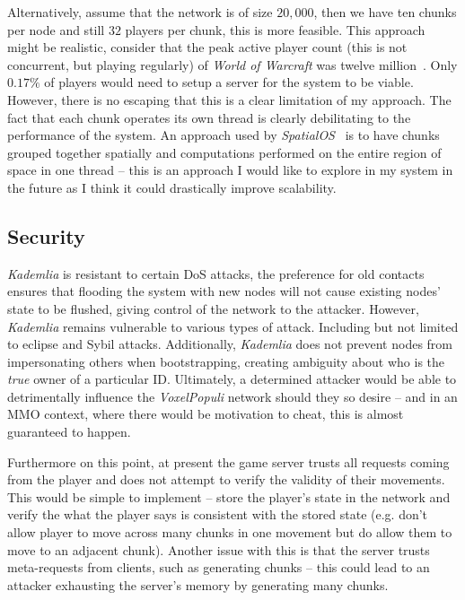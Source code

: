 \documentclass[12pt,notitlepage,a4paper]{report}
\newcommand{\kademlia}{\emph{Kademlia}}
\newcommand{\voxpop}{\emph{VoxelPopuli}}
\begin{document}
	Alternatively, assume that the network is of size $20,000$, then we have ten chunks per node and still $32$ players per chunk, this is more feasible. This approach might be realistic, consider that the peak active player count (this is not concurrent, but playing regularly) of \emph{World of Warcraft} was twelve million~\cite{wowbig}. Only $0.17\%$ of players would need to setup a server for the system to be viable. However, there is no escaping that this is a clear limitation of my approach. The fact that each chunk operates its own thread is clearly debilitating to the performance of the system. An approach used by \emph{SpatialOS}~\cite{SpatialOS} is to have chunks grouped together spatially and computations performed on the entire region of space in one thread -- this is an approach I would like to explore in my system in the future as I think it could drastically improve scalability.
	
	\subsection{Security}
	\label{sec:security}
	\kademlia{} is resistant to certain DoS attacks, the preference for old contacts ensures that flooding the system with new nodes will not cause existing nodes' state to be flushed, giving control of the network to the attacker. However, \kademlia{} remains vulnerable to various types of attack. Including but not limited to eclipse and Sybil attacks. Additionally, \kademlia{} does not prevent nodes from impersonating others when bootstrapping, creating ambiguity about who is the \emph{true} owner of a particular ID. Ultimately, a determined attacker would be able to detrimentally influence the \voxpop{} network should they so desire -- and in an MMO context, where there would be motivation to cheat, this is almost guaranteed to happen.
	
	Furthermore on this point, at present the game server trusts all requests coming from the player and does not attempt to verify the validity of their movements. This would be simple to implement -- store the player's state in the network and verify the what the player says is consistent with the stored state (e.g. don't allow player to move across many chunks in one movement but do allow them to move to an adjacent chunk). Another issue with this is that the server trusts meta-requests from clients, such as generating chunks -- this could lead to an attacker exhausting the server's memory by generating many chunks.
	
\end{document}
